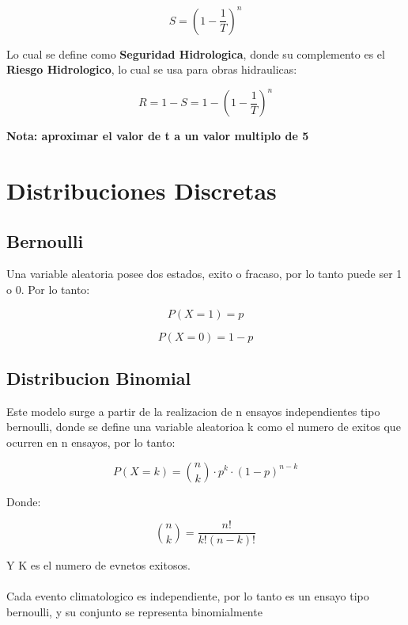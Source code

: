 \begin{equation}
    S = (1 - \frac{1}{T})^n 
\end{equation}

Lo cual se define como \textbf{Seguridad Hidrologica}, donde su complemento es el \textbf{Riesgo Hidrologico}, lo cual se usa para obras hidraulicas:

\begin{equation}
    R = 1- S = 1 - (1 - \frac{1}{T})^n
\end{equation}

\textbf{Nota: aproximar el valor de t a un valor multiplo de 5}

\section{Distribuciones Discretas}

\subsection{Bernoulli}

Una variable aleatoria posee dos estados, exito o fracaso, por lo tanto puede ser 1 o 0. Por lo tanto:

\begin{equation}
    P(X = 1) = p
\end{equation}

\begin{equation}
    P(X = 0) = 1 - p
\end{equation}

\subsection{Distribucion Binomial}

Este modelo surge a partir de la realizacion de n ensayos independientes tipo bernoulli, donde se define una variable aleatorioa k como el numero de exitos que ocurren en n ensayos, por lo tanto:

\begin{equation}
    P(X = k) = \binom{n}{k} \cdot p^k \cdot (1-p)^{n-k}
\end{equation}

Donde:

\begin{equation}
    \binom{n}{k} = \frac{n!}{k!(n-k)!}
\end{equation}

Y K es el numero de evnetos exitosos.
\\ \\
Cada evento climatologico es independiente, por lo tanto es un ensayo tipo bernoulli, y su conjunto se representa binomialmente

